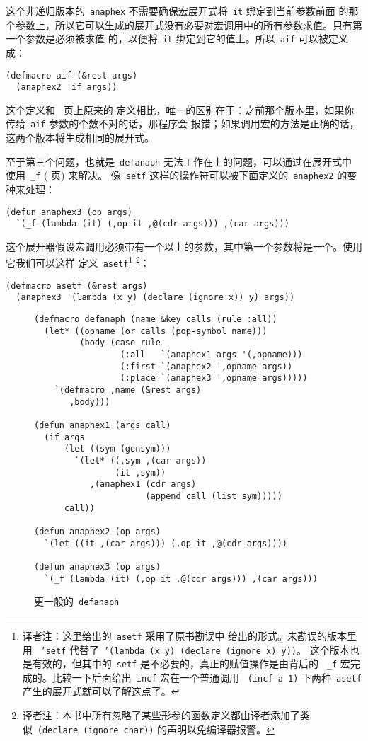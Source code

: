 这个非递归版本的~\texttt{anaphex} 不需要确保宏展开式将~\texttt{it} 绑定到当前参数前面
的那个参数上，所以它可以生成的展开式没有必要对宏调用中的所有参数求值。只有第一个参数是必须被求值
的，以便将~\texttt{it} 绑定到它的值上。所以~\texttt{aif} 可以被定义成：
\begin{lstlisting}
(defmacro aif (&rest args)
  (anaphex2 'if args))
\end{lstlisting}
这个定义和~\pageref{fig:anaphoric_variants_of_common_lisp_operators} 页上原来的
定义相比，唯一的区别在于：之前那个版本里，如果你传给~\texttt{aif} 参数的个数不对的话，那程序会
报错；如果调用宏的方法是正确的话，这两个版本将生成相同的展开式。

至于第三个问题，也就是~\texttt{defanaph} 无法工作在\gv{}上的问题，可以通过在展开式中
使用~\texttt{\_f} (\pageref{fig:more_complex_macros_on_setf} 页) 来解决。
像~\texttt{setf} 这样的操作符可以被下面定义的~\texttt{anaphex2} 的变种来处理：
\begin{lstlisting}
(defun anaphex3 (op args)
  `(_f (lambda (it) (,op it ,@(cdr args))) ,(car args)))
\end{lstlisting}
这个展开器假设宏调用必须带有一个以上的参数，其中第一个参数将是一个\gv{}。使用它我们可以这样
定义~\texttt{asetf}\footnote{译者注：这里给出的~\texttt{asetf} 采用了原书勘误中
  给出的形式。未勘误的版本里用
  ~\texttt{'setf} 代替了~\texttt{'(lambda (x y) (declare (ignore x) y))}。
  这个版本也是有效的，但其中的~\texttt{setf} 是不必要的，真正的\gv{}赋值操作是由背后的
  ~\texttt{\_f} 宏完成的。比较一下后面给出~\texttt{incf} 宏在一个普通调用
  ~\texttt{(incf a 1)} 下两种~\texttt{asetf} 产生的展开式就可以了解这点了。}
  \footnote{译者注：本书中所有忽略了某些形参的函数定义都由译者添加了类似~\texttt{(declare (ignore char))} 
  的声明以免编译器报警。}：
\begin{lstlisting}
(defmacro asetf (&rest args)
  (anaphex3 '(lambda (x y) (declare (ignore x)) y) args))
\end{lstlisting}

\begin{figure}
\begin{lstlisting}
(defmacro defanaph (name &key calls (rule :all))
  (let* ((opname (or calls (pop-symbol name)))
         (body (case rule
                 (:all   `(anaphex1 args '(,opname)))
                 (:first `(anaphex2 ',opname args))
                 (:place `(anaphex3 ',opname args)))))
    `(defmacro ,name (&rest args)
       ,body)))

(defun anaphex1 (args call)
  (if args
      (let ((sym (gensym)))
        `(let* ((,sym ,(car args))
                (it ,sym))
           ,(anaphex1 (cdr args)
                      (append call (list sym)))))
      call))

(defun anaphex2 (op args)
  `(let ((it ,(car args))) (,op it ,@(cdr args))))

(defun anaphex3 (op args)
  `(_f (lambda (it) (,op it ,@(cdr args))) ,(car args)))
\end{lstlisting}
  \caption{更一般的~\texttt{defanaph}}
  \label{fig:more_general_defanaph}
  \label{macro:defanaph}
\end{figure}

